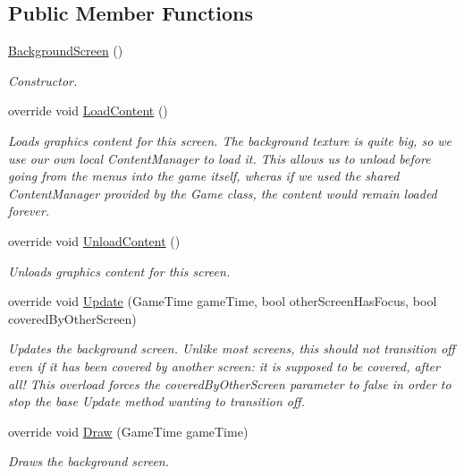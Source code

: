 \subsection*{Public Member Functions}
\begin{DoxyCompactItemize}
\item 
\hyperlink{classCityMania_1_1BackgroundScreen_a7ad1f7edca0074fefc1561ac4997c079}{BackgroundScreen} ()
\begin{DoxyCompactList}\small\item\em Constructor. \item\end{DoxyCompactList}\item 
override void \hyperlink{classCityMania_1_1BackgroundScreen_a1baaefcb8bbe767c96ff168f43f9c327}{LoadContent} ()
\begin{DoxyCompactList}\small\item\em Loads graphics content for this screen. The background texture is quite big, so we use our own local ContentManager to load it. This allows us to unload before going from the menus into the game itself, wheras if we used the shared ContentManager provided by the Game class, the content would remain loaded forever. \item\end{DoxyCompactList}\item 
override void \hyperlink{classCityMania_1_1BackgroundScreen_ac6997881fcbc2ef11ca6a4fb8d093b4b}{UnloadContent} ()
\begin{DoxyCompactList}\small\item\em Unloads graphics content for this screen. \item\end{DoxyCompactList}\item 
override void \hyperlink{classCityMania_1_1BackgroundScreen_aee39777b1741e0c3608b13cdcf8068c3}{Update} (GameTime gameTime, bool otherScreenHasFocus, bool coveredByOtherScreen)
\begin{DoxyCompactList}\small\item\em Updates the background screen. Unlike most screens, this should not transition off even if it has been covered by another screen: it is supposed to be covered, after all! This overload forces the coveredByOtherScreen parameter to false in order to stop the base Update method wanting to transition off. \item\end{DoxyCompactList}\item 
override void \hyperlink{classCityMania_1_1BackgroundScreen_ab1e98d9c96d18bc4395f6bbcc00a82b1}{Draw} (GameTime gameTime)
\begin{DoxyCompactList}\small\item\em Draws the background screen. \item\end{DoxyCompactList}\end{DoxyCompactItemize}


